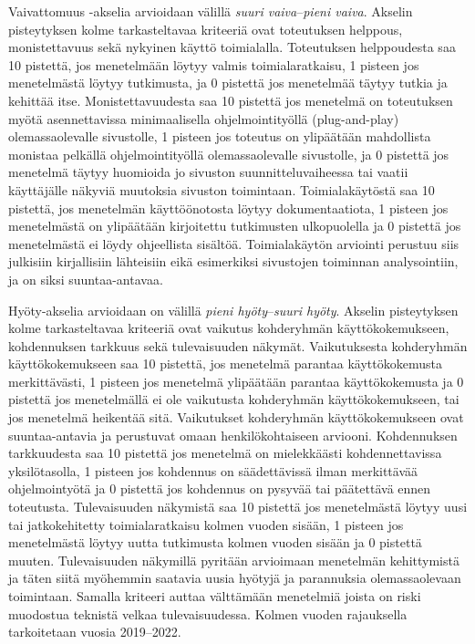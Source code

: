 \documentclass[finnish, 12pt, a4paper, elec, utf8, a-1b, online]{aaltothesis}
\begin{document}
Vaivattomuus -akselia arvioidaan välillä \textit{suuri vaiva}--\textit{pieni
    vaiva}. Akselin pisteytyksen kolme tarkasteltavaa kriteeriä ovat toteutuksen
helppous, monistettavuus sekä nykyinen käyttö toimialalla. Toteutuksen
helppoudesta saa 10 pistettä, jos menetelmään löytyy valmis toimialaratkaisu, 1
pisteen jos menetelmästä löytyy tutkimusta, ja 0 pistettä jos menetelmää täytyy
tutkia ja kehittää itse. Monistettavuudesta saa 10 pistettä jos menetelmä on
toteutuksen myötä asennettavissa minimaalisella ohjelmointityöllä
(plug-and-play) olemassaolevalle sivustolle, 1 pisteen jos toteutus on
ylipäätään mahdollista monistaa pelkällä ohjelmointityöllä olemassaolevalle
sivustolle, ja 0 pistettä jos menetelmä täytyy huomioida jo sivuston
suunnitteluvaiheessa tai vaatii käyttäjälle näkyviä muutoksia sivuston
toimintaan. Toimialakäytöstä saa 10 pistettä, jos menetelmän käyttöönotosta
löytyy dokumentaatiota, 1 pisteen jos menetelmästä on ylipäätään kirjoitettu
tutkimusten ulkopuolella ja 0 pistettä jos menetelmästä ei löydy ohjeellista
sisältöä. Toimialakäytön arviointi perustuu siis julkisiin kirjallisiin
lähteisiin eikä esimerkiksi sivustojen toiminnan analysointiin, ja on siksi
suuntaa-antavaa.

Hyöty-akselia arvioidaan on välillä \textit{pieni hyöty}--\textit{suuri hyöty}.
Akselin pisteytyksen kolme tarkasteltavaa kriteeriä ovat vaikutus kohderyhmän
käyttökokemukseen, kohdennuksen tarkkuus sekä tulevaisuuden näkymät.
Vaikutuksesta kohderyhmän käyttökokemukseen saa 10 pistettä, jos menetelmä
parantaa käyttökokemusta merkittävästi, 1 pisteen jos menetelmä ylipäätään
parantaa käyttökokemusta ja 0 pistettä jos menetelmällä ei ole vaikutusta
kohderyhmän käyttökokemukseen, tai jos menetelmä heikentää sitä. Vaikutukset
kohderyhmän käyttökokemukseen ovat suuntaa-antavia ja perustuvat omaan
henkilökohtaiseen arviooni. Kohdennuksen tarkkuudesta saa 10 pistettä jos
menetelmä on mielekkäästi kohdennettavissa yksilötasolla, 1 pisteen jos
kohdennus on säädettävissä ilman merkittävää ohjelmointyötä ja 0 pistettä jos
kohdennus on pysyvää tai päätettävä ennen toteutusta. Tulevaisuuden näkymistä
saa 10 pistettä jos menetelmästä löytyy uusi tai jatkokehitetty toimialaratkaisu
kolmen vuoden sisään, 1 pisteen jos menetelmästä löytyy uutta tutkimusta kolmen
vuoden sisään ja 0 pistettä muuten. Tulevaisuuden näkymillä pyritään arvioimaan
menetelmän kehittymistä ja täten siitä myöhemmin saatavia uusia hyötyjä ja
parannuksia olemassaolevaan toimintaan. Samalla kriteeri auttaa välttämään
menetelmiä joista on riski muodostua teknistä velkaa tulevaisuudessa. Kolmen
vuoden rajauksella tarkoitetaan vuosia 2019--2022.
\end{document}
